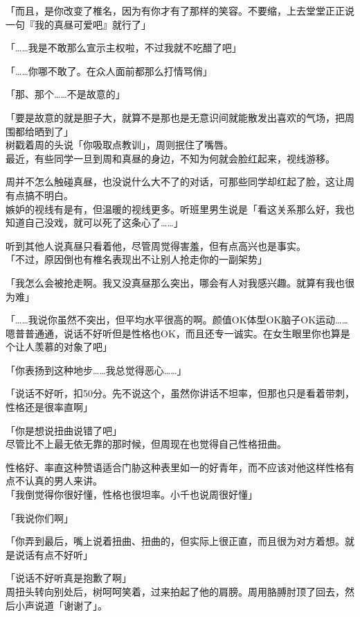 「而且，是你改变了椎名，因为有你才有了那样的笑容。不要缩，上去堂堂正正说一句『我的真昼可爱吧』就行了」

「……我是不敢那么宣示主权啦，不过我就不吃醋了吧」

「……你哪不敢了。在众人面前都那么打情骂俏」

「那、那个……不是故意的」

「要是故意的就是胆子大，就算不是那也是无意识间就能散发出喜欢的气场，把周围都给晒到了」\\

树戳着周的头说「你吸取点教训」，周则抿住了嘴唇。\\

最近，有些同学一旦到周和真昼的身边，不知为何就会脸红起来，视线游移。

周并不怎么触碰真昼，也没说什么大不了的对话，可那些同学却红起了脸，这让周有点搞不明白。\\

嫉妒的视线有是有，但温暖的视线更多。听班里男生说是「看这关系那么好，我也知道自己没戏，就可以死了这条心了……」

听到其他人说真昼只看着他，尽管周觉得害羞，但有点高兴也是事实。\\

「不过，原因倒也有椎名表现出不让别人抢走你的一副架势」

「我怎么会被抢走啊。我又没真昼那么突出，哪会有人对我感兴趣。就算有我也很为难」

「……我说你虽然不突出，但平均水平很高的啊。颜值OK体型OK脑子OK运动……嗯普普通通，说话不好听但是性格也OK，而且还专一诚实。在女生眼里你也算是个让人羡慕的对象了吧」

「你表扬到这种地步……我总觉得恶心……」

「说话不好听，扣50分。先不说这个，虽然你讲话不坦率，但那也只是看着带刺，性格还是很率直啊」

「你是想说扭曲说错了吧」\\

尽管比不上最无依无靠的那时候，但周现在也觉得自己性格扭曲。

性格好、率直这种赞语适合门胁这种表里如一的好青年，而不应该对他这样性格有点不认真的男人来讲。\\

「我倒觉得你很好懂，性格也很坦率。小千也说周很好懂」

「我说你们啊」

「你弄到最后，嘴上说着扭曲、扭曲的，但实际上很正直，而且很为对方着想。就是说话有点不好听」

「说话不好听真是抱歉了啊」\\

周扭头转向别处后，树呵呵笑着，过来拍起了他的肩膀。周用胳膊肘顶了回去，然后小声说道「谢谢了」。
